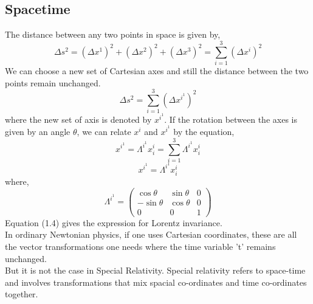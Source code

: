 \subsection{Spacetime}
The distance between any two points in space is given by, 
\begin{equation}
    \Delta s^{2} = (\Delta x^{1})^{2} + (\Delta x^{2})^{2} + (\Delta x^{3})^{2} = \sum_{i=1}^{3}(\Delta x^{i})^{2}
\end{equation}
We can choose a new set of Cartesian axes and still the distance between the two points remain unchanged. 
\begin{equation}
\Delta s^{2} = \sum_{i=1}^{3}(\Delta x^{i^{1}})^{2}
\end{equation}
where the new set of axis is denoted by $x^{i^{1}}$. 
If the rotation between the axes is given by an angle $\theta$, we can  relate $x^{i}$ and $x^{i^{1}}$ by the equation, 
\begin{equation}
x^{i^{1}} = \Lambda ^{i^{1}} x^{i}_{i} =  \sum_{i=1}^{3} \Lambda ^{i^{1}} x^{i}_{i}
\end{equation}
\begin{equation}
x^{i^{1}} = \Lambda ^{i^{1}} x^{i}_{i}
\end{equation}
where, 
\begin{equation}
\Lambda ^{i^{1}} = \begin{pmatrix}
\cos \theta & \sin \theta & 0\\
-\sin \theta & \cos \theta & 0 \\
0 & 0 & 1
\end{pmatrix}
\end{equation}
Equation (1.4) gives the expression for Lorentz invariance.\\ 
In ordinary Newtonian physics, if one uses Cartesian coordinates, these are all the vector transformations one needs where the time variable 't' remains unchanged. \\
But it is not the case in Special Relativity. Special relativity refers to space-time and involves transformations that mix spacial co-ordinates and time co-ordinates together. 
